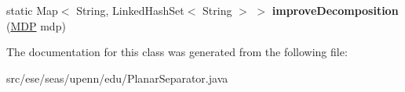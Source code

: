 \begin{DoxyCompactItemize}
\item 
\hypertarget{classese_1_1seas_1_1upenn_1_1edu_1_1_planar_separator_a5ef2580d55968a79d965bcef4d535e03}{}static Map$<$ String, Linked\+Hash\+Set$<$ String $>$ $>$ {\bfseries improve\+Decomposition} (\hyperlink{classese_1_1seas_1_1upenn_1_1edu_1_1_m_d_p}{M\+D\+P} mdp)\label{classese_1_1seas_1_1upenn_1_1edu_1_1_planar_separator_a5ef2580d55968a79d965bcef4d535e03}

\end{DoxyCompactItemize}


The documentation for this class was generated from the following file\+:\begin{DoxyCompactItemize}
\item 
src/ese/seas/upenn/edu/Planar\+Separator.\+java\end{DoxyCompactItemize}
